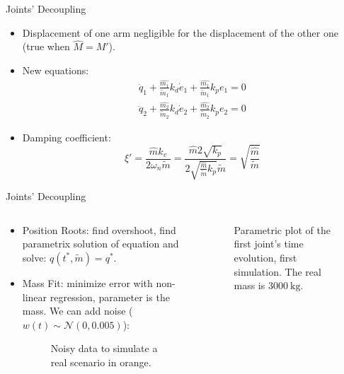 \begin{frame}{Joints' Decoupling}
  \begin{itemize}
    \item Displacement of one arm negligible for the displacement of the other one (true when $\hat{M}=M'$).
    \item New equations:
    \begin{equation}
      \begin{array}{l}
        \ddot{q}_1+\frac{\hat{m_1}}{\tilde{m}_1}k_d\dot{e}_1+\frac{\hat{m_1}}{\tilde{m}_1}k_p e_1=0\\
        \ddot{q}_2+\frac{\hat{m_2}}{\tilde{m}_2}k_d\dot{e}_2+\frac{\hat{m_2}}{\tilde{m}_2}k_p e_2=0
      \end{array}
    \end{equation}
    \item Damping coefficient:
    \begin{equation}
      \xi'=\frac{\hat{m}k_v}{2\omega_n \tilde{m}}=\frac{\hat{m}2\sqrt{k_p}}{2\sqrt{\frac{\hat{m}}{\tilde{m}}k_p} \tilde{m}}=\sqrt{\frac{\hat{m}}{\tilde{m}}}
      \label{mass_relation}
    \end{equation}
  \end{itemize}
\end{frame}

\begin{frame}{Joints' Decoupling}
  \begin{columns}
    \begin{column}{0.5\textwidth}
      \begin{itemize}
        \item Position Roots: find overshoot, find parametrix solution of equation and solve: $q(t^*,\tilde{m})=q^*$.
        \item Mass Fit: minimize error with non-linear regression, parameter is the mass. We can add noise ($w(t)\sim \mathcal{N} (0,0.005)$):
        \vspace{2mm}
        \begin{figure}
          \centering
          
          \caption{Noisy data to simulate a real scenario in orange.}
        \end{figure}
      \end{itemize}
    \end{column}
    \begin{column}{0.5\textwidth}
      \begin{figure}
        \centering
        
        \caption{Parametric plot of the first joint's time evolution, first simulation. The real mass is $\SI{3000}{\kilogram}$.}
      \end{figure}
    \end{column}
  \end{columns}
\end{frame}

